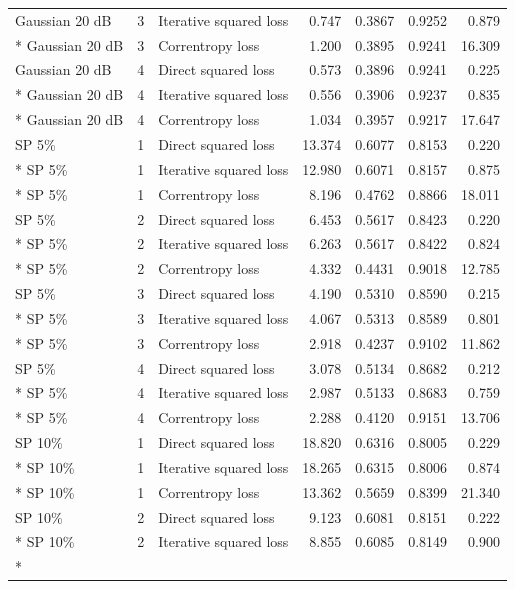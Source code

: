 \begin{longtable}{@{}lr lrrrr@{}}
Gaussian 20 dB & 3 & Iterative squared loss & 0.747 & 0.3867 & 0.9252 & 0.879 \\*
Gaussian 20 dB & 3 & Correntropy loss & 1.200 & 0.3895 & 0.9241 & 16.309 \\
\addlinespace[1.2pt]
Gaussian 20 dB & 4 & Direct squared loss & 0.573 & 0.3896 & 0.9241 & 0.225 \\*
Gaussian 20 dB & 4 & Iterative squared loss & 0.556 & 0.3906 & 0.9237 & 0.835 \\*
Gaussian 20 dB & 4 & Correntropy loss & 1.034 & 0.3957 & 0.9217 & 17.647 \\
\addlinespace[2.4pt]
\midrule
SP 5\% & 1 & Direct squared loss & 13.374 & 0.6077 & 0.8153 & 0.220 \\*
SP 5\% & 1 & Iterative squared loss & 12.980 & 0.6071 & 0.8157 & 0.875 \\*
SP 5\% & 1 & Correntropy loss & 8.196 & 0.4762 & 0.8866 & 18.011 \\
\addlinespace[1.2pt]
SP 5\% & 2 & Direct squared loss & 6.453 & 0.5617 & 0.8423 & 0.220 \\*
SP 5\% & 2 & Iterative squared loss & 6.263 & 0.5617 & 0.8422 & 0.824 \\*
SP 5\% & 2 & Correntropy loss & 4.332 & 0.4431 & 0.9018 & 12.785 \\
\addlinespace[1.2pt]
SP 5\% & 3 & Direct squared loss & 4.190 & 0.5310 & 0.8590 & 0.215 \\*
SP 5\% & 3 & Iterative squared loss & 4.067 & 0.5313 & 0.8589 & 0.801 \\*
SP 5\% & 3 & Correntropy loss & 2.918 & 0.4237 & 0.9102 & 11.862 \\
\addlinespace[1.2pt]
SP 5\% & 4 & Direct squared loss & 3.078 & 0.5134 & 0.8682 & 0.212 \\*
SP 5\% & 4 & Iterative squared loss & 2.987 & 0.5133 & 0.8683 & 0.759 \\*
SP 5\% & 4 & Correntropy loss & 2.288 & 0.4120 & 0.9151 & 13.706 \\
\addlinespace[2.4pt]
\midrule
SP 10\% & 1 & Direct squared loss & 18.820 & 0.6316 & 0.8005 & 0.229 \\*
SP 10\% & 1 & Iterative squared loss & 18.265 & 0.6315 & 0.8006 & 0.874 \\*
SP 10\% & 1 & Correntropy loss & 13.362 & 0.5659 & 0.8399 & 21.340 \\
\addlinespace[1.2pt]
SP 10\% & 2 & Direct squared loss & 9.123 & 0.6081 & 0.8151 & 0.222 \\*
SP 10\% & 2 & Iterative squared loss & 8.855 & 0.6085 & 0.8149 & 0.900 \\*

\end{longtable}
